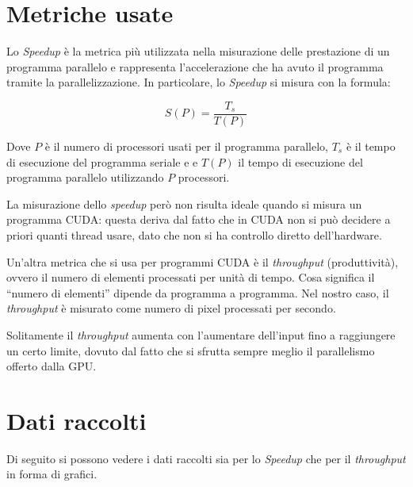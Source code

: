 \documentclass[12pt,a4paper,openright,twoside]{report}
\begin{document}
\section{Metriche usate}

Lo \textit{Speedup} è la metrica più utilizzata nella misurazione delle prestazione di un programma parallelo e rappresenta l'accelerazione che ha avuto il programma tramite la parallelizzazione. In particolare, lo \textit{Speedup} si misura con la formula:

\[ S(P) = \frac{T_{s}}{T(P)}  \]

Dove $P$ è il numero di processori usati per il programma parallelo, $T_{s}$ è il tempo di esecuzione del programma seriale e e $T(P)$ il tempo di esecuzione del programma parallelo utilizzando $P$ processori.

La misurazione dello \textit{speedup} però non risulta ideale quando si misura un programma CUDA: questa deriva dal fatto che in CUDA non si può decidere a priori quanti thread usare, dato che non si ha controllo diretto dell'hardware.

Un'altra metrica che si usa per programmi CUDA è il \textit{throughput} (produttività), ovvero il numero di elementi processati per unità di tempo. Cosa significa il ``numero di elementi'' dipende da programma a programma. Nel nostro caso, il \textit{throughput} è misurato come numero di pixel processati per secondo.

Solitamente il \textit{throughput} aumenta con l'aumentare dell'input fino a raggiungere un certo limite, dovuto dal fatto che si sfrutta sempre meglio il parallelismo offerto dalla GPU.

\section{Dati raccolti}

Di seguito si possono vedere i dati raccolti sia per lo \textit{Speedup} che per il \textit{throughput} in forma di grafici.
\end{document}
